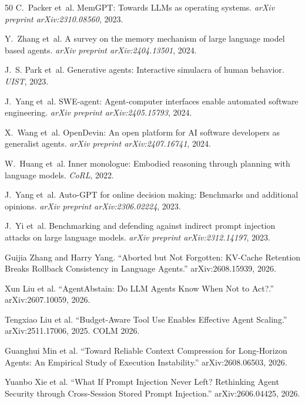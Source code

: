 \documentclass[11pt]{book}
\begin{document}
\begin{thebibliography}{50}
C.~Packer et~al.
\newblock MemGPT: Towards LLMs as operating systems.
\newblock \emph{arXiv preprint arXiv:2310.08560}, 2023.

Y.~Zhang et~al.
\newblock A survey on the memory mechanism of large language model based agents.
\newblock \emph{arXiv preprint arXiv:2404.13501}, 2024.

J.~S. Park et~al.
\newblock Generative agents: Interactive simulacra of human behavior.
\newblock \emph{UIST}, 2023.

J.~Yang et~al.
\newblock SWE-agent: Agent-computer interfaces enable automated software engineering.
\newblock \emph{arXiv preprint arXiv:2405.15793}, 2024.

X.~Wang et~al.
\newblock OpenDevin: An open platform for AI software developers as generalist agents.
\newblock \emph{arXiv preprint arXiv:2407.16741}, 2024.

W.~Huang et~al.
\newblock Inner monologue: Embodied reasoning through planning with language models.
\newblock \emph{CoRL}, 2022.

J.~Yang et~al.
\newblock Auto-GPT for online decision making: Benchmarks and additional opinions.
\newblock \emph{arXiv preprint arXiv:2306.02224}, 2023.

J.~Yi et~al.
\newblock Benchmarking and defending against indirect prompt injection attacks on large language models.
\newblock \emph{arXiv preprint arXiv:2312.14197}, 2023.


Guijia Zhang and Harry Yang.
``Aborted but Not Forgotten: KV-Cache Retention Breaks Rollback Consistency in Language Agents.''
arXiv:2608.15939, 2026.

Xun Liu et al.
``AgentAbstain: Do LLM Agents Know When Not to Act?.''
arXiv:2607.10059, 2026.

Tengxiao Liu et al.
``Budget-Aware Tool Use Enables Effective Agent Scaling.''
arXiv:2511.17006, 2025. COLM 2026.

Guanghui Min et al.
``Toward Reliable Context Compression for Long-Horizon Agents: An Empirical Study of Execution Instability.''
arXiv:2608.06503, 2026.

Yuanbo Xie et al.
``What If Prompt Injection Never Left? Rethinking Agent Security through Cross-Session Stored Prompt Injection.''
arXiv:2606.04425, 2026.


\end{thebibliography}
\end{document}
